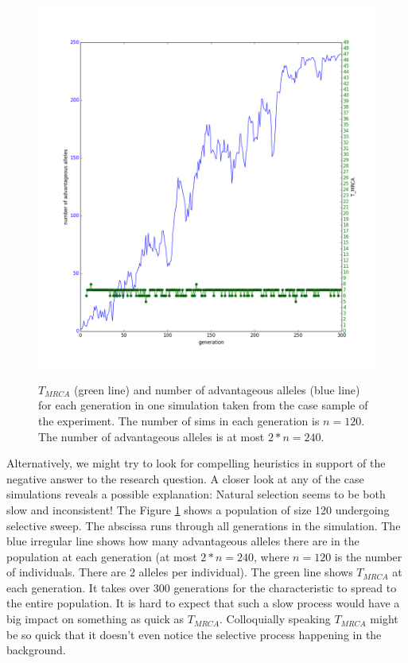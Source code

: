 \documentclass{l4proj}
\begin{document}
\begin{figure}
\centering
\includegraphics[scale=0.5]{slowEvolutionLabels.png}
\label{slowEvolution}
\caption{$T_{MRCA}$ (green line) and number of advantageous alleles (blue line) for each generation in one simulation taken from the case sample of the experiment. The number of sims in each generation is $n=120$. The number of advantageous alleles is at most $2*n=240$.}
\end{figure}

Alternatively, we might try to look for compelling heuristics in support of the negative answer to the research question. A closer look at any of the case simulations reveals a possible explanation: Natural selection seems to be both slow and inconsistent! The Figure \ref{slowEvolution} shows a population of size 120 undergoing selective sweep. The abscissa runs through all generations in the simulation. The blue irregular line shows how many advantageous alleles there are in the population at each generation (at most $2*n=240$, where $n=120$ is the number of individuals. There are 2 alleles per individual). The green line shows $T_{MRCA}$ at each generation. It takes over 300 generations for the characteristic to spread to the entire population. It is hard to expect that such a slow process would have a big impact on something as quick as $T_{MRCA}$. Colloquially speaking $T_{MRCA}$ might be so quick that it doesn't even notice the selective process happening in the background.
\end{document}
